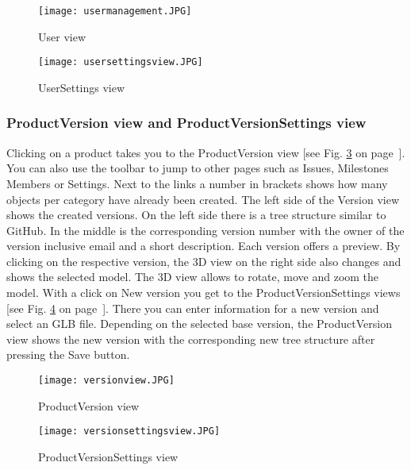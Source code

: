     \begin{figure}[h]
        \centering
        \texttt{[image: usermanagement.JPG]}
        \caption{User view}
        \label{fig: usermanagement}
    \end{figure}

    \begin{figure}[h]
        \centering
        \texttt{[image: usersettingsview.JPG]}
        \caption{UserSettings view}
        \label{fig: usersettingsview}
    \end{figure}

    \subsubsection*{ProductVersion view and ProductVersionSettings view}
    Clicking on a product takes you to the ProductVersion view [see Fig. \ref{fig: versionview} on page~\pageref{fig: versionview}]. You can also use the toolbar to jump to other pages such as Issues, Milestones Members or Settings. Next to the links a number in brackets shows how many objects per category have already been created. The left side of the Version view shows the created versions. On the left side there is a tree structure similar to GitHub. In the middle is the corresponding version number with the owner of the version inclusive email and a short description. Each version offers a preview. By clicking on the respective version, the 3D view on the right side also changes and shows the selected model. The 3D view allows to rotate, move and zoom the model. With a click on New version you get to the ProductVersionSettings views [see Fig. \ref{fig: versionsettingsview} on page~\pageref{fig: versionsettingsview}]. There you can enter information for a new version and select an GLB file. Depending on the selected base version, the ProductVersion view shows the new version with the corresponding new tree structure after pressing the Save button.
    
    \begin{figure}[h]
        \centering
        \texttt{[image: versionview.JPG]}
        \caption{ProductVersion view}
        \label{fig: versionview}
    \end{figure}

    \begin{figure}[h]
        \centering
        \texttt{[image: versionsettingsview.JPG]}
        \caption{ProductVersionSettings view}
        \label{fig: versionsettingsview}
    \end{figure}

